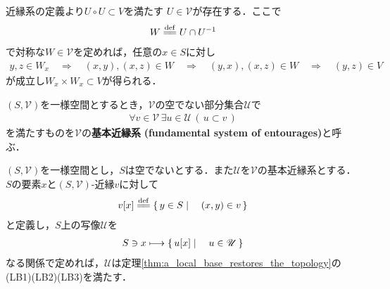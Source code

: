 	\begin{prf}
		近縁系の定義より$U \circ U \subset V$を満たす
		$U \in \mathscr{V}$が存在する．ここで
		\begin{align}
			W \defeq U \cap U^{-1}
		\end{align}
		で対称な$W \in \mathscr{V}$を定めれば，任意の$x \in S$に対し
		\begin{align}
			y,z \in W_x \quad \Longrightarrow \quad
			(x,y),(x,z) \in W \quad \Longrightarrow \quad
			(y,x),(x,z) \in W \quad \Longrightarrow \quad
			(y,z) \in V
		\end{align}
		が成立し$W_x \times W_x \subset V$が得られる．
		\QED
	\end{prf}
	
	\begin{screen}
		\begin{dfn}[基本近縁系]
			$(S,\mathscr{V})$を一様空間とするとき，$\mathscr{V}$の空でない部分集合$\mathscr{U}$で
			\begin{align}
				\forall v \in \mathscr{V}\, \exists u \in \mathscr{U}\, (\, u \subset v\, )
			\end{align}
			を満たすものを$\mathscr{V}$の{\bf 基本近縁系}
			{\bf (fundamental system of entourages)}と呼ぶ．
		\end{dfn}
	\end{screen}
	
	\begin{screen}
		\begin{thm}[近縁系で導入する基本近傍系]\label{thm:fundamental_system_of_neighborhoods_induced_by_the_uniformity}
			$(S,\mathscr{V})$を一様空間とし，$S$は空でないとする．また$\mathscr{U}$を$\mathscr{V}$の基本近縁系とする．
			$S$の要素$x$と$(S,\mathscr{V})$-近縁$v$に対して
			\begin{align}
				v[x] \defeq \Set{y \in S}{(x,y) \in v}
			\end{align}
			と定義し，$S$上の写像$\mathcal{U}$を
			\begin{align}
				S \ni x \longmapsto \left\{\, u[x] \mid \quad u \in \mathscr{U}\, \right\}
			\end{align}
			なる関係で定めれば，$\mathcal{U}$は定理\ref{thm:a_local_base_restores_the_topology}の(LB1)(LB2)(LB3)を満たす．
		\end{thm}
	\end{screen}
	
